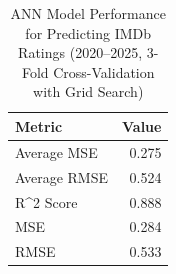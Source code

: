 \begin{table}
\caption{ANN Model Performance for Predicting IMDb Ratings (2020--2025, 3-Fold Cross-Validation with Grid Search)}
\label{tab:ann_results}
\begin{tabular}{lr}
\toprule
Metric & Value \\
\midrule
Average MSE & 0.275 \\
Average RMSE & 0.524 \\
 R^2 Score & 0.888 \\
MSE & 0.284 \\
RMSE & 0.533 \\
\bottomrule
\end{tabular}
\end{table}
